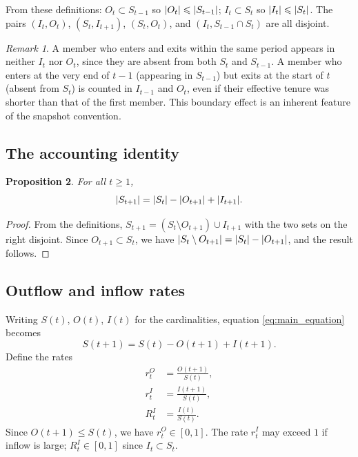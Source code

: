 \documentclass[a4paper,oneside,12pt]{extarticle}
\theoremstyle{plain}
\newtheorem{proposition}{Proposition}
\theoremstyle{definition}
\theoremstyle{remark}
\newtheorem{remark}[proposition]{Remark}
\newcommand*{\ges}{\geqslant}
\newcommand*{\les}{\leqslant}
\DeclarePairedDelimiter{\abs}{\lvert}{\rvert}
\begin{document}
From these definitions: $O_t \subset S_{t-1}$ so $\abs{O_t} \les \abs{S_{t-1}}$;
$I_t \subset S_t$ so $\abs{I_t} \les \abs{S_t}$. The pairs
$(I_t, O_t)$, $(S_t, I_{t+1})$, $(S_t, O_t)$, and $(I_t, S_{t-1}\cap S_t)$
are all disjoint.

\begin{remark}
A member who enters and exits within the same period appears in neither
$I_t$ nor $O_t$, since they are absent from both $S_t$ and $S_{t-1}$.
A member who enters at the very end of $t-1$ (appearing in $S_{t-1}$) but
exits at the start of $t$ (absent from $S_t$) is counted in $I_{t-1}$ and
$O_t$, even if their effective tenure was shorter than that of the first
member. This boundary effect is an inherent feature of the snapshot
convention.
\end{remark}

\subsection{The accounting identity}

\begin{proposition}
\label{prop:identity}
For all $t \ges 1$,
\begin{equation}
\label{eq:main_equation}
\abs{S_{t+1}} = \abs{S_t} - \abs{O_{t+1}} + \abs{I_{t+1}}.
\end{equation}
\end{proposition}

\begin{proof}
From the definitions, $S_{t+1} = (S_t \setminus O_{t+1}) \cup I_{t+1}$
with the two sets on the right disjoint. Since $O_{t+1} \subset S_t$,
we have $\abs{S_t \setminus O_{t+1}} = \abs{S_t} - \abs{O_{t+1}}$,
and the result follows.
\end{proof}

\subsection{Outflow and inflow rates}

Writing $S(t)$, $O(t)$, $I(t)$ for the cardinalities, equation
\eqref{eq:main_equation} becomes
\begin{equation}
\label{eq:time_series}
S(t+1) = S(t) - O(t+1) + I(t+1).
\end{equation}
Define the rates
\begin{align}
r_t^O &= \frac{O(t+1)}{S(t)}, \label{eq:outflow_rate}\\[3pt]
r_t^I &= \frac{I(t+1)}{S(t)}, \label{eq:inflow_rate_1}\\[3pt]
R_t^I &= \frac{I(t)}{S(t)}. \label{eq:inflow_rate_2}
\end{align}
Since $O(t+1) \les S(t)$, we have $r_t^O \in [0,1]$. The rate $r_t^I$
may exceed $1$ if inflow is large; $R_t^I \in [0,1]$ since $I_t \subset S_t$.
\end{document}
